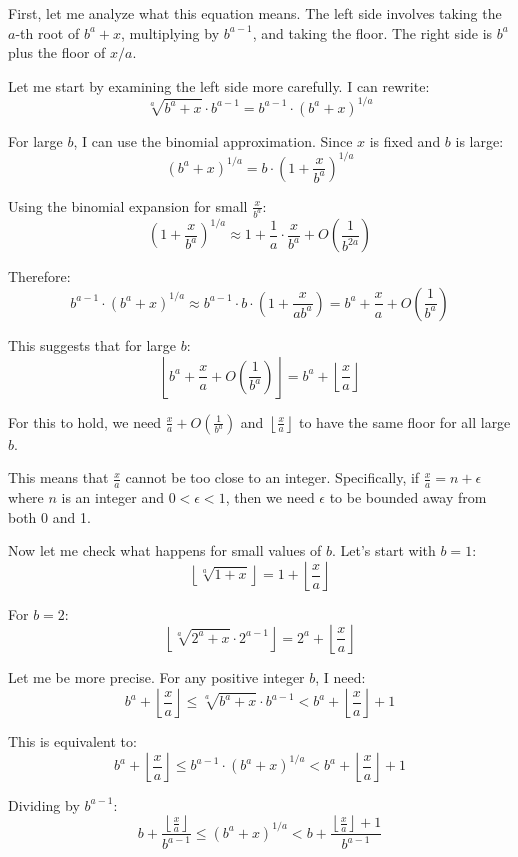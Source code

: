 \documentclass[12pt,a4paper]{article}
\theoremstyle{definition}
\begin{document}
    First, let me analyze what this equation means. The left side involves taking the $a$-th root of $b^a + x$, multiplying by $b^{a-1}$, and taking the floor. The right side is $b^a$ plus the floor of $x/a$.

    Let me start by examining the left side more carefully. I can rewrite:
    $$\sqrt[a]{b^a + x} \cdot b^{a-1} = b^{a-1} \cdot (b^a + x)^{1/a}$$

    For large $b$, I can use the binomial approximation. Since $x$ is fixed and $b$ is large:
    $$(b^a + x)^{1/a} = b \cdot \left(1 + \frac{x}{b^a}\right)^{1/a}$$

    Using the binomial expansion for small $\frac{x}{b^a}$:
    $$\left(1 + \frac{x}{b^a}\right)^{1/a} \approx 1 + \frac{1}{a} \cdot \frac{x}{b^a} + O\left(\frac{1}{b^{2a}}\right)$$

    Therefore:
    $$b^{a-1} \cdot (b^a + x)^{1/a} \approx b^{a-1} \cdot b \cdot \left(1 + \frac{x}{ab^a}\right) = b^a + \frac{x}{a} + O\left(\frac{1}{b^a}\right)$$

    This suggests that for large $b$:
    $$\left\lfloor b^a + \frac{x}{a} + O\left(\frac{1}{b^a}\right) \right\rfloor = b^a + \left\lfloor \frac{x}{a} \right\rfloor$$

    For this to hold, we need $\frac{x}{a} + O\left(\frac{1}{b^a}\right)$ and $\left\lfloor \frac{x}{a} \right\rfloor$ to have the same floor for all large $b$.

    This means that $\frac{x}{a}$ cannot be too close to an integer. Specifically, if $\frac{x}{a} = n + \epsilon$ where $n$ is an integer and $0 < \epsilon < 1$, then we need $\epsilon$ to be bounded away from both 0 and 1.

    Now let me check what happens for small values of $b$. Let's start with $b = 1$:
    $$\left\lfloor \sqrt[a]{1 + x} \right\rfloor = 1 + \left\lfloor \frac{x}{a} \right\rfloor$$

    For $b = 2$:
    $$\left\lfloor \sqrt[a]{2^a + x} \cdot 2^{a-1} \right\rfloor = 2^a + \left\lfloor \frac{x}{a} \right\rfloor$$

    Let me be more precise. For any positive integer $b$, I need:
    $$b^a + \left\lfloor \frac{x}{a} \right\rfloor \leq \sqrt[a]{b^a + x} \cdot b^{a-1} < b^a + \left\lfloor \frac{x}{a} \right\rfloor + 1$$

    This is equivalent to:
    $$b^a + \left\lfloor \frac{x}{a} \right\rfloor \leq b^{a-1} \cdot (b^a + x)^{1/a} < b^a + \left\lfloor \frac{x}{a} \right\rfloor + 1$$

    Dividing by $b^{a-1}$:
    $$b + \frac{\left\lfloor \frac{x}{a} \right\rfloor}{b^{a-1}} \leq (b^a + x)^{1/a} < b + \frac{\left\lfloor \frac{x}{a} \right\rfloor + 1}{b^{a-1}}$$
\end{document}
